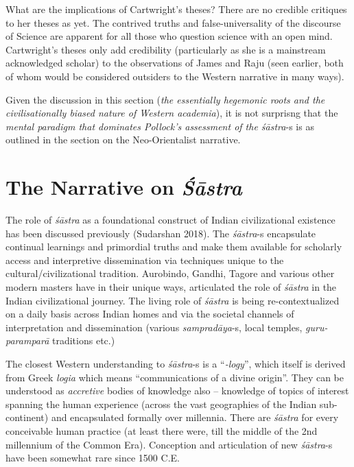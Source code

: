 What are the implications of Cartwright’s theses? There are no credible critiques to her theses as yet. The contrived truths and false-universality of the discourse of Science are apparent for all those who question science with an open mind. Cartwright’s theses only add credibility (particularly as she is a mainstream acknowledged scholar) to the observations of James and Raju (seen earlier, both of whom would be considered outsiders to the Western narrative in many ways).

Given the discussion in this section (\textit{the essentially hegemonic roots and the civilisationally biased nature of Western academia}), it is not surprisng that the \textit{mental paradigm that dominates Pollock’s assessment of the śāstra}-s is as outlined in the section on the Neo-Orientalist narrative.


\section*{The Narrative on \textit{Śāstra}}

The role of \textit{śāstra} as a foundational construct of Indian civilizational existence has been discussed previously (Sudarshan 2018). The \hbox{\textit{śāstra}-s} encapsulate continual learnings and primordial truths and make them available for scholarly access and interpretive dissemination via techniques unique to the cultural/civilizational tradition. Aurobindo, Gandhi, Tagore and various other modern masters have in their unique ways, articulated the role of \textit{śāstra} in the Indian civilizational journey. The living role of \textit{śāstra} is being re-contextualized on a daily basis across Indian homes and via the societal channels of interpretation and dissemination (various \textit{sampradāya}-s, local temples, \textit{guru-paramparā} traditions etc.)

The closest Western understanding to \textit{śāstra}-s is a “\textit{-logy}”, which itself is derived from Greek \textit{logia} which means “communications of a divine origin”. They can be understood as \textit{accretive} bodies of knowledge also – knowledge of topics of interest spanning the human experience (across the vast geographies of the Indian sub-continent) and encapsulated formally over millennia. There are \textit{śāstra} for every conceivable human practice (at least there were, till the middle of the 2nd millennium of the Common Era). Conception and articulation of new \textit{śāstra}-s have been somewhat rare since 1500 C.E.

